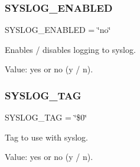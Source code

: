 \subsubsection{\texorpdfstring{S\+Y\+S\+L\+O\+G\+\_\+\+E\+N\+A\+B\+L\+ED}{SYSLOG\_ENABLED}}
{\footnotesize\ttfamily S\+Y\+S\+L\+O\+G\+\_\+\+E\+N\+A\+B\+L\+ED = \char`\"{}no\char`\"{}}



Enables / disables logging to syslog. 

Value\+: yes or no (y / n). \mbox{\label{bsfl_8sh_aeb08842be9710b858b9e92f078a117a2}} 
\subsubsection{\texorpdfstring{S\+Y\+S\+L\+O\+G\+\_\+\+T\+AG}{SYSLOG\_TAG}}
{\footnotesize\ttfamily S\+Y\+S\+L\+O\+G\+\_\+\+T\+AG = \char`\"{}\$0\char`\"{}}



Tag to use with syslog. 

Value\+: yes or no (y / n). 
